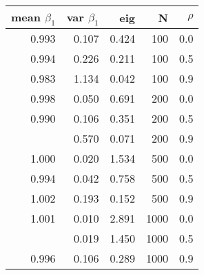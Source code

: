 
\begin{tabular}{rrrrr}
\toprule
mean $\beta_1$ & var $\beta_1$ & eig & N & $\rho$\\
\midrule
0.993 & 0.107 & 0.424 & 100 & 0.0\\
0.994 & 0.226 & 0.211 & 100 & 0.5\\
0.983 & 1.134 & 0.042 & 100 & 0.9\\
0.998 & 0.050 & 0.691 & 200 & 0.0\\
0.990 & 0.106 & 0.351 & 200 & 0.5\\
\addlinespace
0.977 & 0.570 & 0.071 & 200 & 0.9\\
1.000 & 0.020 & 1.534 & 500 & 0.0\\
0.994 & 0.042 & 0.758 & 500 & 0.5\\
1.002 & 0.193 & 0.152 & 500 & 0.9\\
1.001 & 0.010 & 2.891 & 1000 & 0.0\\
\addlinespace
1.005 & 0.019 & 1.450 & 1000 & 0.5\\
0.996 & 0.106 & 0.289 & 1000 & 0.9\\
\bottomrule
\end{tabular}
